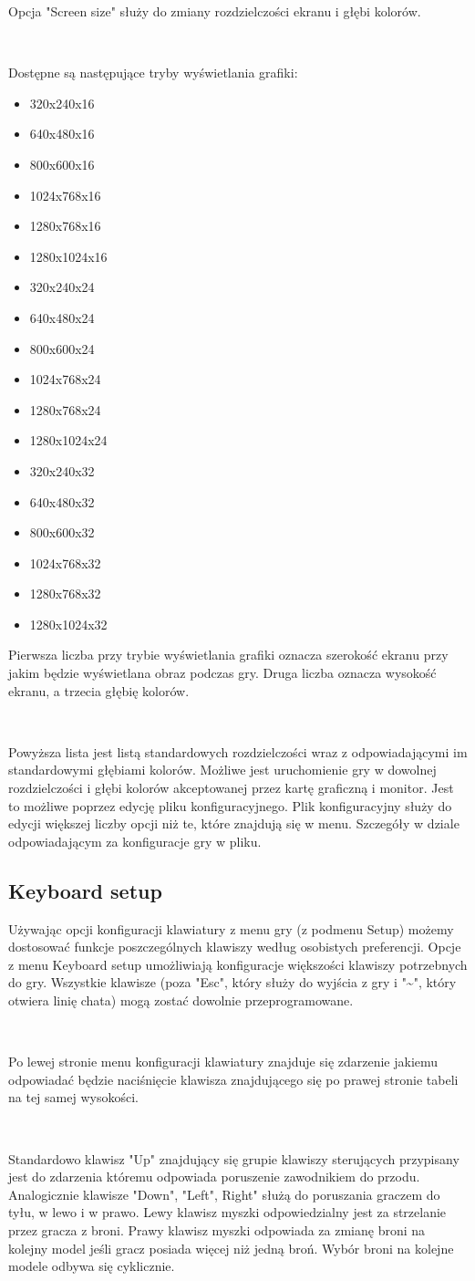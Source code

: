 \documentclass[licencjacka]{pracamgr}
\begin{document}
Opcja "Screen size" służy do zmiany rozdzielczości ekranu i głębi kolorów.

\ \

Dostępne są następujące tryby wyświetlania grafiki:

\begin{itemize}
    \item 320x240x16
    \item640x480x16
    \item800x600x16
    \item1024x768x16
    \item1280x768x16
    \item1280x1024x16
    \item320x240x24
    \item640x480x24
    \item800x600x24
    \item1024x768x24
    \item1280x768x24
    \item1280x1024x24
    \item320x240x32
    \item640x480x32
    \item800x600x32
    \item1024x768x32
    \item1280x768x32
    \item1280x1024x32
\end{itemize}

Pierwsza liczba przy trybie wyświetlania grafiki oznacza szerokość ekranu przy jakim będzie wyświetlana obraz podczas gry. Druga liczba oznacza wysokość ekranu, a trzecia głębię kolorów.

\ \

Powyższa lista jest listą standardowych rozdzielczości wraz z odpowiadającymi im standardowymi głębiami kolorów. Możliwe jest uruchomienie gry w dowolnej rozdzielczości i głębi kolorów akceptowanej przez kartę graficzną i monitor. Jest to możliwe poprzez edycję pliku konfiguracyjnego. Plik konfiguracyjny służy do edycji większej liczby opcji niż te, które znajdują się w menu. Szczegóły w dziale odpowiadającym za konfiguracje gry w pliku.

\subsection{Keyboard setup}

Używając opcji konfiguracji klawiatury z menu gry (z podmenu Setup) możemy dostosować funkcje poszczególnych klawiszy według osobistych preferencji. Opcje z menu Keyboard setup umożliwiają konfiguracje większości klawiszy potrzebnych do gry. Wszystkie klawisze (poza "Esc", który służy do wyjścia z gry i "\textasciitilde", który otwiera linię chata) mogą zostać dowolnie przeprogramowane.

\ \

Po lewej stronie menu konfiguracji klawiatury znajduje się zdarzenie jakiemu odpowiadać będzie naciśnięcie klawisza znajdującego się po prawej stronie tabeli na tej samej wysokości.

\ \

Standardowo klawisz "Up" znajdujący się grupie klawiszy sterujących przypisany jest do zdarzenia któremu odpowiada poruszenie zawodnikiem do przodu. Analogicznie klawisze "Down", "Left", Right" służą do poruszania graczem do tyłu, w lewo i w prawo.
Lewy klawisz myszki odpowiedzialny jest za strzelanie przez gracza z broni.
Prawy klawisz myszki odpowiada za zmianę broni na kolejny model jeśli gracz posiada więcej niż jedną broń. Wybór broni na kolejne modele odbywa się cyklicznie.
\end{document}
